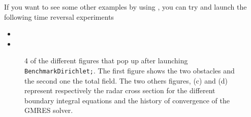 If you want to see some other examples by using \mudiff, you can try and launch the following time reversal experiments
\begin{itemize}
\item {}
\item
{}
\end{itemize}

\begin{figure}
\caption{4 of the different figures that pop up after launching \texttt{BenchmarkDirichlet;}. The first figure shows the two obstacles and the second one the total field. The two others figures, (c) and (d) represent respectively the radar cross section for the different boundary integral equations and the history of convergence of the GMRES solver.}
\end{figure}
